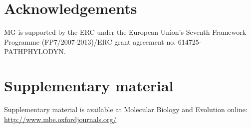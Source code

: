\documentclass[nogrid]{MBE}%
\begin{document}
\section{Acknowledgements}
MG is supported by the ERC under the European Union’s Seventh Framework Programme (FP7/2007-2013)/ERC grant agreement no. 614725-PATHPHYLODYN. 

\ifmbeformat
\section{Supplementary material}
Supplementary material is available  at Molecular Biology and Evolution
online: \url{http://www.mbe.oxfordjournals.org/}
\fi

\end{document}
